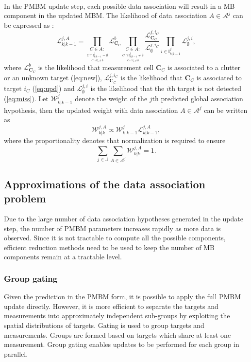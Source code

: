 ~\\
In the PMBM update step, each possible data association will result in a MB component in the updated MBM. The likelihood of data association $A\in\mathcal{A}^j$ can be expressed as \cite{pmbmextended2}:
\begin{equation}
\mathcal{L}^{j,A}_{k|k-1}=\prod_{\underset{\underset{C\cap \mathbb{M}_k\neq \emptyset}{C\cap \mathbb{I}^j_{k|k-1}=\emptyset}}{C\in A:}}\mathcal{L}^b_{\mathbf{C}_C}\prod_{\underset{\underset{C\cap \mathbb{M}_k\neq \emptyset}{C\cap \mathbb{I}^j_{k|k-1}\neq\emptyset}}{C\in A:}}\frac{\mathcal{L}^{j,i_C}_{\mathbf{C}_C}}{\mathcal{L}^{j,i_C}_{\emptyset}}\prod_{i\in\mathbb{I}^j_{k|k-1}}\mathcal{L}^{j,i}_{\emptyset},
\end{equation}
where $\mathcal{L}^b_{\mathbf{C}_C}$ is the likelihood that measurement cell $\mathbf{C}_C$ is associated to a clutter or an unknown target (\ref{eq:new}), $\mathcal{L}^{j,i_C}_{\mathbf{C}_C}$ is the likelihood that $\mathbf{C}_C$ is associated to target $i_C$ (\ref{eq:upd}) and $\mathcal{L}^{j,i}_{\emptyset}$ is the likelihood that the $i$th target is not detected (\ref{eq:miss}). Let $\mathcal{W}^j_{k|k-1}$ denote the weight of the $j$th predicted global association hypothesis, then the updated weight with data association $A\in\mathcal{A}^j$ can be written as
\begin{equation}
\mathcal{W}^{j,A}_{k|k}\propto \mathcal{W}^{j}_{k|k-1}\mathcal{L}^{j,A}_{k|k-1},
\end{equation}
where the proportionality denotes that normalization is required to ensure
\begin{equation}
    \sum_{j\in\mathbb{J}}\sum_{A\in\mathcal{A}^j}\mathcal{W}^{j,A}_{k|k}=1.
\end{equation}

\subsection{Approximations of the data association problem}
Due to the large number of data association hypotheses generated in the update step, the number of PMBM parameters increases rapidly as more data is observed. Since it is not tractable to compute all the possible components, efficient reduction methods need to be used to keep the number of MB components remain at a tractable level. 


\subsubsection{Group gating}
Given the prediction in the PMBM form, it is possible to apply the full PMBM update directly. However, it is more efficient to separate the targets and measurements into approximately independent sub-groups by exploiting the spatial distributions of targets. Gating \cite[Sec. 2.2.2.2]{gating} is used to group targets and measurements. Groups are formed based on targets which share at least one measurement. Group gating enables updates to be performed for each group in parallel.



